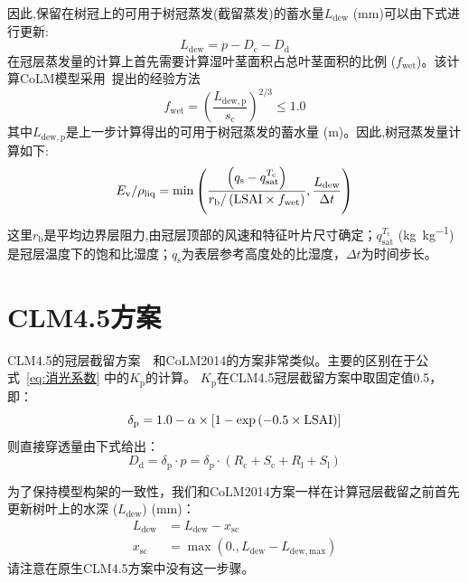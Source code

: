 因此,保留在树冠上的可用于树冠蒸发(截留蒸发)的蓄水量$L_{\mathrm{dew}}$ (mm)可以由下式进行更新:
\begin{equation}
  L_{\mathrm{dew}}={p}-D_{\mathrm{c}}-D_{\mathrm{d}}
\end{equation}
在冠层蒸发量的计算上首先需要计算湿叶茎面积占总叶茎面积的比例 ($f_{\mathrm{wet}}$)。该计算CoLM模型采用~\citet{dickinson1993biosphere}提出的经验方法
\begin{equation}
  f_{\mathrm{{wet}}}=\left(\frac{L_{\mathrm{dew, p}}}{s_{\mathrm{c}}}\right)^{2 / 3} \leqslant 1.0
\end{equation}
其中$L_{\mathrm{dew, p}}$是上一步计算得出的可用于树冠蒸发的蓄水量 (m)。因此,树冠蒸发量计算如下:
\begin{equation}
  E_{\mathrm{v}} / \rho_{\mathrm{liq}}=\min \left(\frac{\left(q_{\mathrm{s}}-q_{\mathrm{sat}}^{T_{\mathrm{c}}}\right)}{r_{\mathrm{b}} /\left({\rm LSAI} \times f_{\mathrm{wet}}\right)}, \frac{L_{\mathrm{dew}}}{\Delta t}\right)
\end{equation}
这里$r_{\mathrm {b}} $是平均边界层阻力,由冠层顶部的风速和特征叶片尺寸确定；$q_{\mathrm{sat}}^{T_{\mathrm {c}} }$ (\unit{kg.kg^{-1}})是冠层温度下的饱和比湿度；$q_{\mathrm {s}} $为表层参考高度处的比湿度，$\Delta t$为时间步长。


\section{CLM4.5方案}
CLM4.5的冠层截留方案~\citep{oleson2013technical}~和CoLM2014的方案非常类似。主要的区别在于公式~\eqref{eq:消光系数} 中的$K_{\mathrm {p}} $的计算。
$K_{\mathrm {p}} $在CLM4.5冠层截留方案中取固定值0.5，即：
%
\begin{equation}
  \delta_{\mathrm{p}}=1.0-\alpha \times\left[1-\exp \left(-0.5 \times {\rm LSAI}\right)\right]
\end{equation}
则直接穿透量由下式给出：
\begin{equation}
  D_{\mathrm{d}}=\delta_{\mathrm{p}} \cdot p=\delta_{\mathrm{p}} \cdot\left(R_{\mathrm{c}}+S_{\mathrm{c}}+R_{\mathrm{l}}+S_{\mathrm{l}}\right)
\end{equation}

为了保持模型构架的一致性，我们和CoLM2014方案一样在计算冠层截留之前首先更新树叶上的水深 ($L_{\mathrm{dew}}$) (mm)：
\begin{equation}
  \begin{aligned}
    L_{\mathrm{dew}} &= L_{\mathrm{dew}}-x_{\mathrm{sc}} \\
    x_{\mathrm{s c}} &= \max \left(0., L_{\mathrm{dew}}-L_{\mathrm{dew,max}}\right)
  \end{aligned}
\end{equation}
请注意在原生CLM4.5方案中没有这一步骤。

